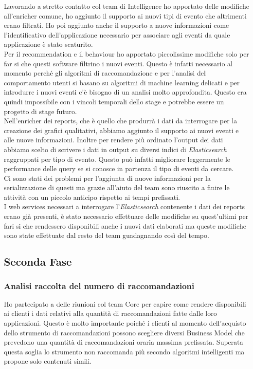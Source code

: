 \documentclass[a4paper, 12pt, twoside, openright]{book}
\begin{document}
Lavorando a stretto contatto col team di Intelligence ho apportato delle modifiche all'enricher comune, ho aggiunto il supporto ai nuovi tipi di evento che altrimenti erano filtrati. Ho poi aggiunto anche il supporto a nuove informazioni come l'identificativo dell'applicazione necessario per associare agli eventi da quale applicazione è stato scaturito.\\
Per il recommendation e il behaviour ho apportato piccolissime modifiche solo per far si che questi software filtrino i nuovi eventi. Questo è infatti necessario al momento perché gli algoritmi di raccomandazione e per l'analisi del comportamento utenti si basano su algoritmi di machine learning delicati e per introdurre i nuovi eventi c'è bisogno di un analisi molto approfondita. Questo era quindi impossibile con i vincoli temporali dello stage e potrebbe essere un progetto di stage futuro.\\
Nell'enricher dei reports, che è quello che produrrà i dati da interrogare per la creazione dei grafici qualitativi, abbiamo aggiunto il supporto ai nuovi eventi e alle nuove informazioni. Inoltre per rendere più ordinato l'output dei dati abbiamo scelto di scrivere i dati in output su diversi indici di \textit{Elasticsearch} raggruppati per tipo di evento. Questo può infatti migliorare leggermente le performance delle query se si conosce in partenza il tipo di eventi da cercare.\\

Ci sono stati dei problemi per l'aggiunta di nuove informazioni per la serializzazione di questi ma grazie all'aiuto del team sono riuscito a finire le attività con un piccolo anticipo rispetto ai tempi prefissati.\\
I web services necessari a interrogare l'\textit{Elasticsearch} contenente i dati dei reports erano già presenti, è stato necessario effettuare delle modifiche su quest'ultimi per fari si che rendessero disponibili anche i nuovi dati elaborati ma queste modifiche sono state effettuate dal resto del team guadagnando così del tempo.\\

\subsection{Seconda Fase}

\subsubsection{Analisi raccolta del numero di raccomandazioni}
Ho partecipato a delle riunioni col team Core per capire come rendere disponibili ai clienti i dati relativi alla quantità di raccomandazioni fatte dalle loro applicazioni. Questo è molto importante poiché i clienti al momento dell'acquisto dello strumento di raccomandazioni possono scegliere diversi Business Model che prevedono una quantità di raccomandazioni oraria massima prefissata. Superata questa soglia lo strumento non raccomanda più secondo algoritmi intelligenti ma propone solo contenuti simili.\\
\end{document}
